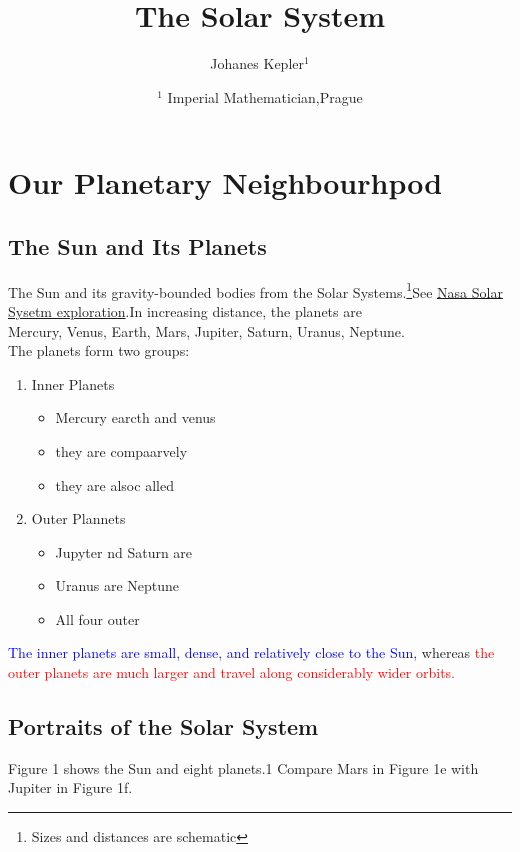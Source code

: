 \documentclass[11pt]{article}
\title{The Solar System}
\author{Johanes Kepler$^1$}
\date{
\small
$^1$ Imperial Mathematician,Prague
}
\begin{document}
\maketitle

\section{Our Planetary Neighbourhpod}
\subsection{The Sun and Its Planets}
The Sun and its gravity-bounded bodies from the Solar Systems\cite{kepler1609}.\footnote{Sizes and distances are schematic}See \href{https://science.nasa.gov/}{Nasa Solar Sysetm exploration}.In increasing distance, the planets are \\
Mercury, Venus, Earth, Mars, Jupiter, Saturn, Uranus, Neptune.\\
The planets form two groups:
\begin{enumerate}[label=(\Roman*)]
    \item Inner Planets
    \begin{itemize}[label=\textdagger]
        \item Mercury earcth and venus
        \item they are compaarvely
        \item they are alsoc alled
    \end{itemize}
    \item Outer Plannets
        \begin{itemize}[label=\textdagger]
        \item Jupyter nd  Saturn are
        \item Uranus are Neptune
        \item All four outer 
    \end{itemize}
\end{enumerate}

\textcolor{blue}{The inner planets are small, dense, and relatively close to the Sun, }whereas
\textcolor{red}{the outer planets are much larger and travel along considerably wider orbits.}

\subsection{Portraits of the Solar System}
Figure 1 shows the Sun and eight planets.1
Compare Mars in Figure 1e with Jupiter in Figure 1f.
\end{document}
